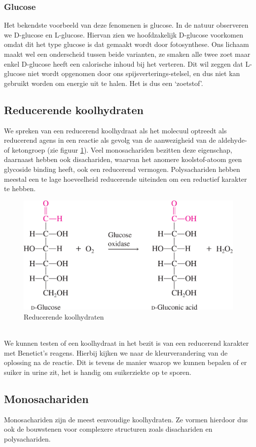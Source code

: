 \documentclass[a4paper,kul]{kulakarticle} %
\begin{document}
\subsubsection{Glucose}
Het bekendste voorbeeld van deze fenomenen is glucose. In de natuur observeren we D-glucose en L-glucose. Hiervan zien we hoofdzakelijk D-glucose voorkomen omdat dit het type glucose is dat gemaakt wordt door fotosynthese. Ons lichaam maakt wel een onderscheid tussen beide varianten, ze smaken alle twee zoet maar enkel D-glucose heeft een calorische inhoud bij het verteren. Dit wil zeggen dat L-glucose niet wordt opgenomen door ons spijsverterings-stelsel, en dus niet kan  gebruikt worden om energie uit te halen. Het is dus een `zoetstof'.

\subsection{Reducerende koolhydraten}
We spreken van een reducerend koolhydraat als het molecuul optreedt als reducerend agens in een reactie als gevolg van de aanwezigheid van de aldehyde- of ketongroep (zie figuur \ref{fig:reductiefding}). Veel monosachariden bezitten deze eigenschap, daarnaast hebben ook disachariden, waarvan het anomere koolstof-atoom geen glycoside binding heeft, ook een reducerend vermogen. Polysachariden hebben meestal een te lage hoeveelheid reducerende uiteinden om een reductief karakter te hebben.
\begin{figure}[htbp]
	\centering
	\includegraphics[width=0.5\linewidth]{ReductiefDing}
	\caption[Reducerende koolhydraten]{Reducerende koolhydraten}
	\label{fig:reductiefding}
\end{figure}\\
We kunnen testen of een koolhydraat in het bezit is van een reducerend karakter met Benetict's reagens. Hierbij kijken we naar de kleurverandering van de oplossing na de reactie. Dit is tevens de manier waarop we kunnen bepalen of er suiker in urine zit, het is handig om suikerziekte op te sporen.

\subsection{Monosachariden}
Monosachariden zijn de meest eenvoudige koolhydraten. Ze vormen hierdoor dus ook de bouwstenen voor complexere structuren zoals disachariden en polysachariden. 
\end{document}
